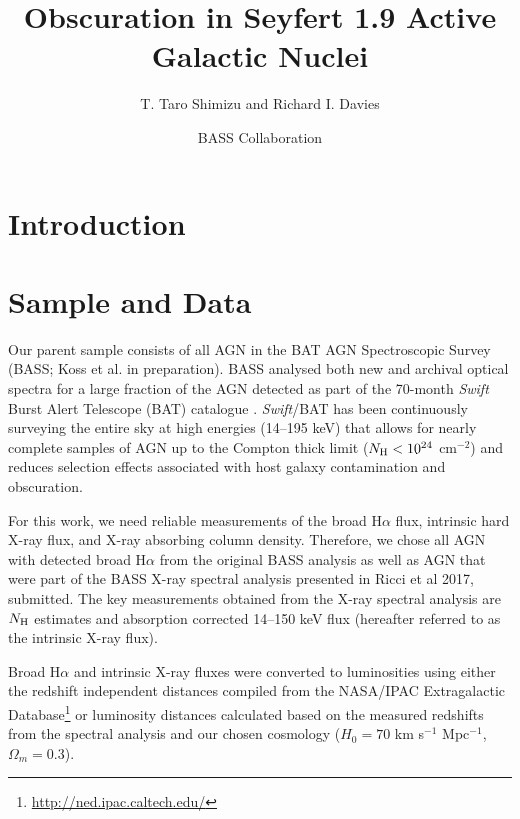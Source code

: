 \documentclass[twocolumn,trackchanges]{aastex6}
\newcommand{\halpha}{H$\alpha$}
\newcommand{\nh}{$N_{\rm H}$}
\begin{document}
\title{Obscuration in Seyfert 1.9 Active Galactic Nuclei}
\author{T. Taro Shimizu and Richard I. Davies}
\author{BASS Collaboration}

\begin{abstract}
\end{abstract}


\section{Introduction}\label{sec:intro}
\section{Sample and Data}\label{sec:data}
Our parent sample consists of all AGN in the BAT AGN Spectroscopic Survey (BASS; Koss et al. in preparation). BASS analysed both new and archival optical spectra for a large fraction of the AGN detected as part of the 70-month \textit{Swift} Burst Alert Telescope (BAT) \citep{Gehrels:2004qf, Barthelmy:2005ul} catalogue \citep{Baumgartner:2013fq}. \textit{Swift}/BAT has been continuously surveying the entire sky at high energies (14--195 keV) that allows for nearly complete samples of AGN up to the Compton thick limit ($N_{\rm H} < 10^{24}$ cm$^{-2}$) and reduces selection effects associated with host galaxy contamination and obscuration.

For this work, we need reliable measurements of the broad \halpha{} flux, intrinsic hard X-ray flux, and X-ray absorbing column density. Therefore, we chose all AGN with detected broad \halpha{} from the original BASS analysis as well as AGN that were part of the BASS X-ray spectral analysis presented in Ricci et al 2017, submitted. The key measurements obtained from the X-ray spectral analysis are \nh{} estimates and absorption corrected 14--150 keV flux (hereafter referred to as the intrinsic X-ray flux). 

Broad \halpha{} and intrinsic X-ray fluxes were converted to luminosities using either the redshift independent distances compiled from the NASA/IPAC Extragalactic Database\footnote{\url{http://ned.ipac.caltech.edu/}} or luminosity distances calculated based on the measured redshifts from the spectral analysis and our chosen cosmology ($H_{0}=70$ km s$^{-1}$ Mpc$^{-1}$, $\Omega_{m} = 0.3$).
\end{document}
